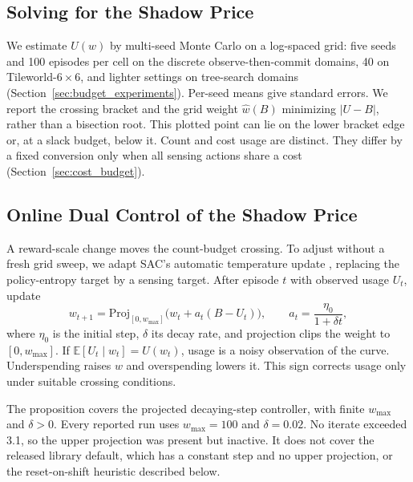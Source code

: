 \subsection{Solving for the Shadow Price}
\label{sec:budget_solve}

We estimate $U(w)$ by multi-seed Monte Carlo on a log-spaced grid: five seeds and 100 episodes per cell on the discrete observe-then-commit domains, 40 on Tileworld-$6\times6$, and lighter settings on tree-search domains (Section~\ref{sec:budget_experiments}). Per-seed means give standard errors. We report the crossing bracket and the grid weight $\hat w(B)$ minimizing $|U-B|$, rather than a bisection root. This plotted point can lie on the lower bracket edge or, at a slack budget, below it. Count and cost usage are distinct. They differ by a fixed conversion only when all sensing actions share a cost (Section~\ref{sec:cost_budget}).

\subsection{Online Dual Control of the Shadow Price}
\label{sec:pi5}

A reward-scale change moves the count-budget crossing. To adjust without a fresh grid sweep, we adapt SAC's automatic temperature update \citep{haarnoja2018sac}, replacing the policy-entropy target by a sensing target. After episode $t$ with observed usage $U_t$, update
\begin{equation}
\label{eq:dual_update}
w_{t+1}=\mathrm{Proj}_{[0,w_{\max}]}\big(w_t+a_t(B-U_t)\big),\qquad a_t=\frac{\eta_0}{1+\delta t},
\end{equation}
where $\eta_0$ is the initial step, $\delta$ its decay rate, and projection clips the weight to $[0,w_{\max}]$. If $\mathbb E[U_t\mid w_t]=U(w_t)$, usage is a noisy observation of the curve. Underspending raises $w$ and overspending lowers it. This sign corrects usage only under suitable crossing conditions.

The proposition covers the projected decaying-step controller, with finite $w_{\max}$ and $\delta>0$. Every reported run uses $w_{\max}=100$ and $\delta=0.02$. No iterate exceeded 3.1, so the upper projection was present but inactive. It does not cover the released library default, which has a constant step and no upper projection, or the reset-on-shift heuristic described below.

